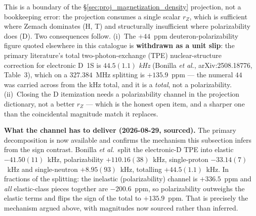 \documentclass[11pt]{article}
\begin{document}
This is a boundary of the \S\ref{sec:proj_magnetization_density}
projection, not a bookkeeping error: the projection consumes a single
scalar $r_Z$, which is sufficient where Zemach dominates (H, T) and
structurally insufficient where polarizability does (D).  Two
consequences follow.  (i)~The $+44$~ppm deuteron-polarizability figure
quoted elsewhere in this catalogue is \textbf{withdrawn as a unit
slip}: the primary literature's total two-photon-exchange (TPE)
nuclear-structure correction for electronic D~1S is $44.5(1.1)$
\emph{kHz} (Bonilla \emph{et al.}, arXiv:2508.18776, Table~3), which on
a $327.384$~MHz splitting is $+135.9$~ppm --- the numeral $44$ was
carried across from the kHz total, and it is a \emph{total}, not a
polarizability.  (ii)~Closing the D
itemization needs a polarizability channel in the projection dictionary,
not a better $r_Z$ --- which is the honest open item, and a sharper one
than the coincidental magnitude match it replaces.

\textbf{What the channel has to deliver (2026-08-29, sourced).}  The
primary decomposition is now available and confirms the mechanism this
subsection infers from the sign contrast.  Bonilla \emph{et al.}\ split
the electronic-D TPE into elastic $-41.50(11)$~kHz, polarizability
$+110.16(38)$~kHz, single-proton $-33.14(7)$~kHz and single-neutron
$+8.95(93)$~kHz, totalling $+44.5(1.1)$~kHz.  In fractions of the
splitting: the inelastic (polarizability) channel is $+336.5$~ppm and
\emph{all} elastic-class pieces together are $-200.6$~ppm, so
polarizability outweighs the elastic terms and flips the sign of the
total to $+135.9$~ppm.  That is precisely the mechanism argued above,
with magnitudes now sourced rather than inferred.
\end{document}
